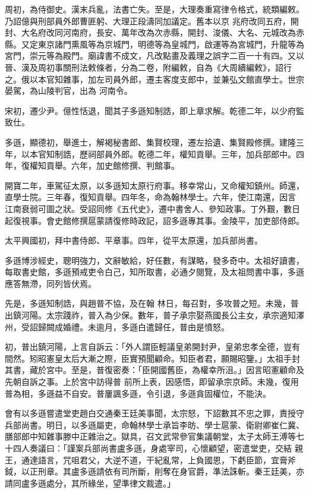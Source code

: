 \begin{pinyinscope}
 周初，為侍御史。漢末兵亂，法書亡失。至是，大理奏重寫律令格式，統類編敕。乃詔億與刑部員外郎曹匪躬、大理正段濤同加議定。舊本以京
 兆府改同五府，開封、大名府改同河南府，長安、萬年改為次赤縣，開封、浚儀、大名、元城改為赤縣。又定東京諸門熏風等為京城門，明德等為皇城門，啟運等為宮城門，升龍等為宮門，崇元等為殿門。廟諱書不成文，凡改點畫及義理之誤字二百一十有四。又以晉、漢及周初事關刑法敕條者，分為二卷，附編敕，自為《大周續編敕》，詔行之。俄以本官知雜事，加左司員外郎，遷主客度支郎中，並兼弘文館直學士。世宗晏駕，為山陵判官，出為
 河南令。



 宋初，遷少尹。億性恬退，聞其子多遜知制誥，即上章求解。乾德二年，以少府監致仕。



 多遜，顯德初，舉進士，解褐秘書郎、集賢校理，遷左拾遺、集賢殿修撰。建隆三年，以本官知制誥，歷祠部員外郎。乾德二年，權知貢舉。三年，加兵部郎中。四年，復權知貢舉。六年，加史館修撰、判館事。



 開寶二年，車駕征太原，以多遜知太原行府事。移幸常山，又命權知鎮州。師還，直學士院。三年春，復知貢舉。四年冬，命為翰林學士。六年，使江南還，因言
 江南衰弱可圖之狀。受詔同修《五代史》，遷中書舍人、參知政事。丁外艱，數日起復視事。會史館修撰扈蒙請復修時政記，詔多遜專其事。金陵平，加吏部侍郎。



 太平興國初，拜中書侍郎、平章事。四年，從平太原還，加兵部尚書。



 多遜博涉經史，聰明強力，文辭敏給，好任數，有謀略，發多奇中。太祖好讀書，每取書史館，多遜預戒吏令白己，知所取書，必通夕閱覽，及太祖問書中事，多遜應答無滯，同列皆伏焉。



 先是，多遜知制誥，與趙普不協，及在翰
 林日，每召對，多攻普之短。未幾，普出鎮河陽。太宗踐祚，普入為少保。數年，普子承宗娶燕國長公主女，承宗適知澤州，受詔歸闕成婚禮。未逾月，多遜白遣歸任，普由是憤怒。



 初，普出鎮河陽，上言自訴云：「外人謂臣輕議皇弟開封尹，皇弟忠孝全德，豈有間然。矧昭憲皇太后大漸之際，臣實預聞顧命。知臣者君，願賜昭鑒。」太祖手封其書，藏於宮中。至是，普復密奏：「臣開國舊臣，為權幸所沮。」因言昭憲顧命及先朝自訴之事。上於宮中訪得普
 前所上表，因感悟，即留承宗京師。未幾，復用普為相，多遜益不自安。普屢諷多遜，令引退，多遜貪固權位，不能決。



 會有以多遜嘗遣堂吏趙白交通秦王廷美事聞，太宗怒，下詔數其不忠之罪，責授守兵部尚書。明日，以多遜屬吏，命翰林學士承旨李昉、學士扈蒙、衛尉卿崔仁冀、膳部郎中知雜事滕中正雜治之。獄具，召文武常參官集議朝堂，太子太師王溥等七十四人奏議曰：「謹案兵部尚書盧多遜，身處宰司，心懷顧望，密遣堂吏，交結
 親王，通達語言，咒咀君父，大逆不道，干紀亂常，上負國恩，下虧臣節，宜膏斧鉞，以正刑章。其盧多遜請依有司所斷，削奪在身官爵，準法誅斬。秦王廷美，亦請同盧多遜處分，其所緣坐，望準律文裁遣。」




\end{pinyinscope}
